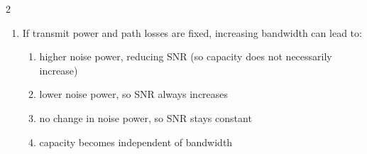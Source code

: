 \begin{multicols}{2}
\begin{enumerate}[leftmargin=*, itemsep=0.4em]
\item If transmit power and path losses are fixed, increasing bandwidth can lead to:
\begin{enumerate}[label=\alph*)]
\item higher noise power, reducing SNR (so capacity does not necessarily increase)
\item lower noise power, so SNR always increases
\item no change in noise power, so SNR stays constant
\item capacity becomes independent of bandwidth
\end{enumerate}

\end{enumerate}
\end{multicols}
